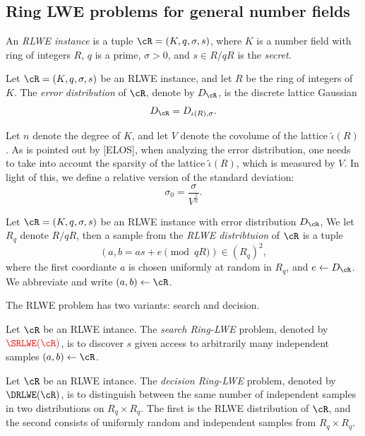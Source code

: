 \documentclass{amsart}
\begin{document}
\subsection{Ring LWE problems for general number fields}

\begin{Definition}
An {\it RLWE instance} is a tuple $\cR = (K,q,\sigma,s)$, where $K$ is a number field with ring of integers $R$, $q$ is a prime, $\sigma >0$, and $s \in R/qR$ is the {\it secret}.
\end{Definition}


\begin{Definition}
Let $\cR = (K,q,\sigma,s)$ be an RLWE instance, and let $R$ be the ring of integers of $K$. The {\it error distribution} of $\cR$, denote by $D_\cR$, is the discrete lattice Gaussian
\[
D_\cR = D_{\iota(R),\sigma}.
\]
\end{Definition}

Let $n$ denote the degree of $K$, and let $V$ denote the covolume of the lattice $\tilde{\iota}(R)$. As is pointed out by [ELOS], when analyzing the error distribution, one needs to take into account the sparsity of the lattice $\tilde{\iota}(R)$, which is measured by $V$. In light of this, we define a relative version of the standard deviation: $$\sigma_0 = \frac{\sigma}{V^{\frac{1}{n}}}.$$

\begin{Definition}
Let $\cR = (K,q,\sigma, s)$ be an RLWE instance with error distribution $D_\cR$, We let $R_q$ denote $R/qR$, then
a sample from the {\it RLWE distribtuion} of $\cR$ is a tuple
$$(a, b = as+e\pmod{qR}) \in (R_q)^2, $$
where the first coordiante $a$ is chosen uniformly at random in $R_q$, and $e \gets D_\cR$. We abbreviate and write $(a,b) \gets \cR$.
\end{Definition}

The RLWE problem has two variants: search and decision.

\begin{Definition}[Search]
Let $\cR$ be an RLWE intance. The {\it search Ring-LWE} problem, denoted by ${\color{red}{\SRLWE(\cR)}}$, is to discover $s$ given access to arbitrarily many independent samples $(a,b) \gets \cR$.
\end{Definition}

\begin{Definition}[Decision]
Let $\cR$ be an RLWE intance. The {\it decision Ring-LWE}
problem, denoted by $\DRLWE(\cR)$, is to distinguish between the same number of independent samples in two distributions on $R_q \times R_q$. The first is the RLWE distribution of $\cR$, and the second consists of uniformly random and independent samples from $R_q \times R_q$.
\end{Definition}
\end{document}
